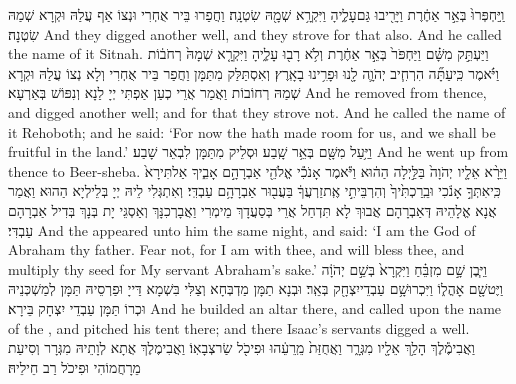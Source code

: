 {וַֽיַּחְפְּרוּ֙ בְּאֵ֣ר אַחֶ֔רֶת וַיָּרִ֖יבוּ גַּם\maqqaf עָלֶ֑יהָ וַיִּקְרָ֥א שְׁמָ֖הּ שִׂטְנָֽה׃}
{וַחֲפַרוּ בֵּיר אֻחְרִי וּנְצוֹ אַף עֲלַהּ וּקְרָא שְׁמַהּ שִׂטְנָה׃}
{And they digged another well, and they strove for that also. And he called the name of it Sitnah.}{}
{וַיַּעְתֵּ֣ק מִשָּׁ֗ם וַיַּחְפֹּר֙ בְּאֵ֣ר אַחֶ֔רֶת וְלֹ֥א רָב֖וּ עָלֶ֑יהָ וַיִּקְרָ֤א שְׁמָהּ֙ רְחֹב֔וֹת וַיֹּ֗אמֶר כִּֽי\maqqaf עַתָּ֞ה הִרְחִ֧יב יְהֹוָ֛ה לָ֖נוּ וּפָרִ֥ינוּ בָאָֽרֶץ׃}
{וְאִסְתַּלַּק מִתַּמָּן וַחֲפַר בֵּיר אֻחְרִי וְלָא נְצוֹ עֲלַהּ וּקְרָא שְׁמַהּ רְחוֹבוֹת וַאֲמַר אֲרֵי כְעַן אַפְתִּי יְיָ לַנָא וְנִפּוֹשׁ בְּאַרְעָא׃}
{And he removed from thence, and digged another well; and for that they strove not. And he called the name of it Rehoboth; and he said: ‘For now the \lord\space hath made room for us, and we shall be fruitful in the land.’}{}
{וַיַּ֥עַל מִשָּׁ֖ם בְּאֵ֥ר שָֽׁבַע׃}
{וּסְלֵיק מִתַּמָּן לִבְאֵר שָׁבַע׃}
{And he went up from thence to Beer-sheba.}{}
{וַיֵּרָ֨א אֵלָ֤יו יְהֹוָה֙ בַּלַּ֣יְלָה הַה֔וּא וַיֹּ֕אמֶר אָנֹכִ֕י אֱלֹהֵ֖י אַבְרָהָ֣ם אָבִ֑יךָ אַל\maqqaf תִּירָא֙ כִּֽי\maqqaf אִתְּךָ֣ אָנֹ֔כִי וּבֵֽרַכְתִּ֙יךָ֙ וְהִרְבֵּיתִ֣י אֶֽת\maqqaf זַרְעֲךָ֔ בַּעֲב֖וּר אַבְרָהָ֥ם עַבְדִּֽי׃}
{וְאִתְגְּלִי לֵיהּ יְיָ בְּלֵילְיָא הַהוּא וַאֲמַר אֲנָא אֱלָהֵיהּ דְּאַבְרָהָם אֲבוּךְ לָא תִּדְחַל אֲרֵי בְּסַעֲדָךְ מֵימְרִי וַאֲבָרְכִנָּךְ וְאַסְגֵּי יָת בְּנָךְ בְּדִיל אַבְרָהָם עַבְדִּי׃}
{And the \lord\space appeared unto him the same night, and said: ‘I am the God of Abraham thy father. Fear not, for I am with thee, and will bless thee, and multiply thy seed for My servant Abraham’s sake.’}{}
{וַיִּ֧בֶן שָׁ֣ם מִזְבֵּ֗חַ וַיִּקְרָא֙ בְּשֵׁ֣ם יְהֹוָ֔ה וַיֶּט\maqqaf שָׁ֖ם אׇהֳל֑וֹ וַיִּכְרוּ\maqqaf שָׁ֥ם עַבְדֵי\maqqaf יִצְחָ֖ק בְּאֵֽר׃}
{וּבְנָא תַמָּן מַדְבְּחָא וְצַלִּי בִּשְׁמָא דַּייָ וּפַרְסֵיהּ תַּמָּן לְמַשְׁכְּנֵיהּ וּכְרוֹ תַּמָּן עַבְדֵי יִצְחָק בֵּירָא׃}
{And he builded an altar there, and called upon the name of the \lord, and pitched his tent there; and there Isaac’s servants digged a well.}{}
{וַאֲבִימֶ֕לֶךְ הָלַ֥ךְ אֵלָ֖יו מִגְּרָ֑ר וַאֲחֻזַּת֙ מֵֽרֵעֵ֔הוּ וּפִיכֹ֖ל שַׂר\maqqaf צְבָאֽוֹ׃}
{וַאֲבִימֶלֶךְ אֲתָא לְוָתֵיהּ מִגְּרָר וְסִיעַת מֵרָחֲמוֹהִי וּפִיכׂל רַב חֵילֵיהּ׃}
